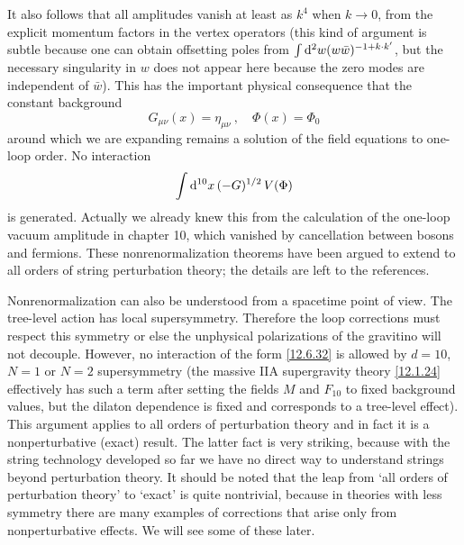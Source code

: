 It also follows that all amplitudes vanish at least as $k^4$ when $k \to 0$, from the explicit momentum factors in the vertex operators (this kind of argument is subtle because one can obtain offsetting poles from $\int \mathrm{d}^2 w (w\bar{w})^{-1+k\cdot k'}$, but the necessary singularity in $w$ does not appear here because the zero modes are independent of $\bar{w}$). This has the important physical consequence that the constant background
\begin{equation}
	G_{\mu\nu}(x) = \eta_{\mu\nu} \:, \quad \Phi(x) = \Phi_0 \label{12.6.31}
\end{equation}
around which we are expanding remains a solution of the field equations to one-loop order. No interaction
\begin{equation}
	\int \mathrm{d}^{10}x\,(-G)^{1/2}\,V(\Phi) \label{12.6.32}
\end{equation}
is generated. Actually we already knew this from the calculation of the one-loop vacuum amplitude in chapter 10, which vanished by cancellation between bosons and fermions. These nonrenormalization theorems have been argued to extend to all orders of string perturbation theory; the details are left to the references.

Nonrenormalization can also be understood from a spacetime point of view. The tree-level action has local supersymmetry. Therefore the loop corrections must respect this symmetry or else the unphysical polarizations of the gravitino will not decouple. However, no interaction of the form \eqref{12.6.32} is allowed by $d=10$, $N=1$ or $N=2$ supersymmetry (the massive IIA supergravity theory \eqref{12.1.24} effectively has such a term after setting the fields $M$ and $F_{\textit{10}}$ to fixed background values, but the dilaton dependence is fixed and corresponds to a tree-level effect). This argument applies to all orders of perturbation theory and in fact it is a nonperturbative (exact) result. The latter fact is very striking, because with the string technology developed so far we have no direct way to understand strings beyond perturbation theory. It should be noted that the leap from `all orders of perturbation theory' to `exact' is quite nontrivial, because in theories with less symmetry there are many examples of corrections that arise only from nonperturbative effects. We will see some of these later.

